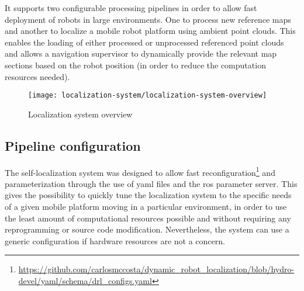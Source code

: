 It supports two configurable processing pipelines in order to allow fast deployment of robots in large environments. One to process new reference maps and another to localize a mobile robot platform using ambient point clouds. This enables the loading of either processed or unprocessed referenced point clouds and allows a navigation supervisor to dynamically provide the relevant map sections based on the robot position (in order to reduce the computation resources needed).

\begin{figure}[H]
	\centering
	\texttt{[image: localization-system/localization-system-overview]}
	\caption{Localization system overview}
	\label{fig:localization-system_localization-system-overview}
\end{figure}


\subsection{Pipeline configuration}

The self-localization system was designed to allow fast reconfiguration\footnote{\url{https://github.com/carlosmccosta/dynamic_robot_localization/blob/hydro-devel/yaml/schema/drl_configs.yaml}} and parameterization through the use of yaml files and the \gls{ros} parameter server. This gives the possibility to quickly tune the localization system to the specific needs of a given mobile platform moving in a particular environment, in order to use the least amount of computational resources possible and without requiring any reprogramming or source code modification. Nevertheless, the system can use a generic configuration if hardware resources are not a concern.

